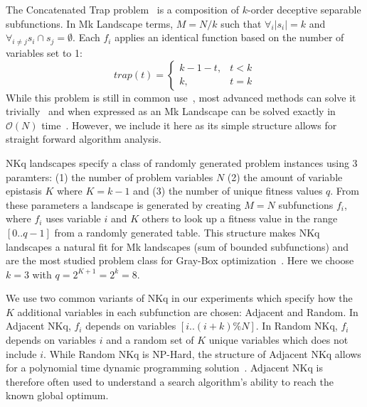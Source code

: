 \documentclass[runningheads,a4paper]{llncs}
\newcommand{\BigO}[1]{$\mathcal{O}{(#1)}$}
\begin{document}
The Concatenated Trap problem~\cite{deb:1992:trap} is a composition of $k$-order deceptive
separable subfunctions. In Mk Landscape terms, $M=N/k$ such that $\forall_i |s_i| = k$ and
$\forall_{i \neq j} s_i \cap s_j = \emptyset$. Each $f_i$ applies an identical function based
on the number of variables set to 1:
\begin{equation}
   trap(t) = \left\{
     \begin{array}{rl}
       k-1-t, &  t<k\\
       k,   &  t = k
     \end{array}
   \right.
  \label{eq-trap}
\end{equation}
While this problem is still in common use~\cite{hsu:2015:dsmgaII,inoue:2015:adaptivep3},
most advanced methods can solve it trivially~\cite{goldman:2012:ltga} and when expressed
as an Mk Landscape can be solved exactly in \BigO{N} time~\cite{whitley:2015:mk}. However,
we include it here as its simple structure allows for straight forward algorithm analysis.

NKq landscapes specify a class of randomly generated problem instances using 3 paramters:
(1) the number of problem variables $N$ (2) the amount of variable epistasis $K$ where $K=k-1$
and (3) the number of unique fitness values $q$. From these parameters a landscape is generated
by creating $M=N$ subfunctions $f_i$, where $f_i$ uses variable $i$ and $K$ others to look up
a fitness value in the range $[0..q-1]$ from a randomly generated table. This structure
makes NKq landscapes a natural fit for Mk landscapes (sum of bounded subfunctions)
and are the most studied problem class for Gray-Box
optimization~\cite{whitley:2012:constant,goldman:2015:GBO,tintos:2015:partitioncross,ochoa:2015:crossovernetworks,whitley:2015:mk}.
Here we choose $k=3$ with $q=2^{K+1}=2^{k}=8$.

We use two common variants of NKq in our experiments which specify how the $K$ additional
variables in each subfunction are chosen: Adjacent and Random. In Adjacent NKq, $f_i$ depends
on variables $[i..(i+k)\%N]$. In Random NKq, $f_i$ depends on variables $i$ and a random
set of $K$ unique variables which does not include $i$. While Random NKq is NP-Hard,
the structure of Adjacent NKq allows for a polynomial time dynamic programming solution~\cite{wright:2000:solvingnk}.
Adjacent NKq is therefore often used to understand a search algorithm's ability to reach the known global
optimum.
\end{document}
